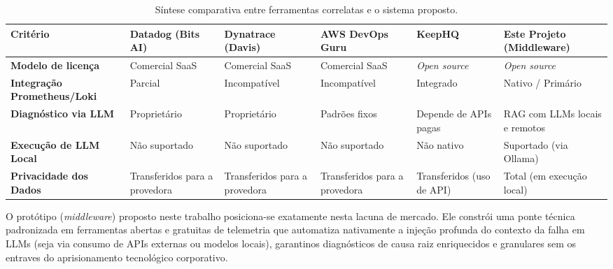 \begin{table}[htbp]
    \centering
    \small
    \caption{Síntese comparativa entre ferramentas correlatas e o sistema proposto.}
    \label{tab:sintese_ferramentas}
    \begin{tabular}{p{2.5cm} p{2cm} p{2cm} p{2cm} p{2cm} p{2.2cm}}
        \hline
        \textbf{Critério} & \textbf{Datadog (Bits AI)} & \textbf{Dynatrace (Davis)} & \textbf{AWS DevOps Guru} & \textbf{KeepHQ} & \textbf{Este Projeto (Middleware)} \\ 
        \hline
        \textbf{Modelo de licença} & Comercial SaaS & Comercial SaaS & Comercial SaaS & \textit{Open source} & \textit{Open source} \\ 
        \textbf{Integração Prometheus/Loki} & Parcial & Incompatível & Incompatível & Integrado & Nativo / Primário \\ 
        \textbf{Diagnóstico via LLM} & Proprietário & Proprietário & Padrões fixos & Depende de APIs pagas & RAG com LLMs locais e remotos \\ 
        \textbf{Execução de LLM Local} & Não suportado & Não suportado & Não suportado & Não nativo & Suportado (via Ollama) \\ 
        \textbf{Privacidade dos Dados} & Transferidos para a provedora & Transferidos para a provedora & Transferidos para a provedora & Transferidos (uso de API) & Total (em execução local) \\ 
        \hline
    \end{tabular}
\end{table}

O protótipo (\textit{middleware}) proposto neste trabalho posiciona-se exatamente nesta lacuna de mercado. Ele constrói uma ponte técnica padronizada em ferramentas abertas e gratuitas de telemetria que automatiza nativamente a injeção profunda do contexto da falha em LLMs (seja via consumo de APIs externas ou modelos locais), garantinos diagnósticos de causa raiz enriquecidos e granulares sem os entraves do aprisionamento tecnológico corporativo.
